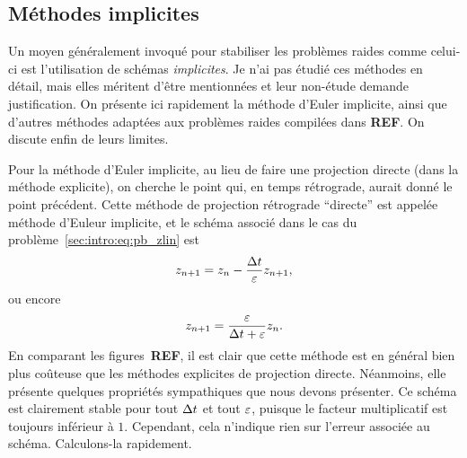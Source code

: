 



\subsection*{Méthodes implicites}

Un moyen généralement invoqué pour stabiliser les problèmes raides comme
celui-ci est l'utilisation de schémas \textit{implicites}. Je n'ai pas
étudié ces méthodes en détail, mais elles méritent d'être mentionnées et
leur non-étude demande justification. On présente ici rapidement la
méthode d'Euler implicite, ainsi que d'autres méthodes adaptées aux
problèmes raides compilées dans \textbf{REF}. On
discute enfin de leurs limites.


Pour la méthode d'Euler implicite, au lieu de faire une projection
directe (dans la méthode explicite), on cherche le point qui, en temps
rétrograde, aurait donné le point précédent.
%
%
\noindent%
Cette méthode de projection rétrograde \enquote{directe} est appelée
méthode d'Euleur implicite, et le schéma associé dans le cas du
problème~\eqref{sec:intro:eq:pb_zlin} est 
\begin{equation*}
    z_{n+1} = z_n - \frac{\Delta t}{\varepsilon} z_{n+1} ,
\end{equation*}
ou encore 
\begin{equation*}
    z_{n+1} = \frac{\varepsilon}{\Delta t + \varepsilon} z_n .
\end{equation*}
En comparant les figures~\textbf{REF}, il est clair que
cette méthode est en général bien plus coûteuse que les méthodes
explicites de projection directe. Néanmoins, elle présente quelques
propriétés sympathiques que nous devons présenter. Ce schéma est
clairement stable pour tout $\Delta t$ et tout $\varepsilon$, puisque le facteur
multiplicatif est toujours inférieur à $1$. Cependant, cela n'indique
rien sur l'erreur associée au schéma. Calculons-la rapidement.

